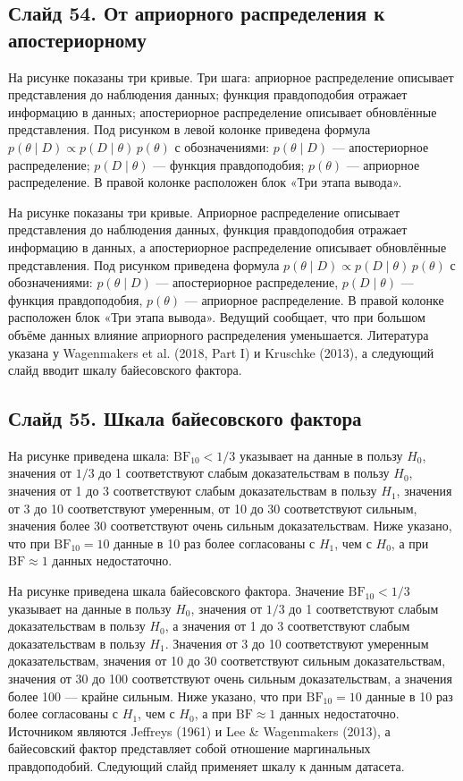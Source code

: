 \documentclass[11pt,a4paper]{article}
\begin{document}
\subsection*{Слайд 54. От априорного распределения к апостериорному}
\begin{onslide}
На рисунке показаны три кривые. Три шага: априорное распределение описывает представления до наблюдения данных; функция правдоподобия отражает информацию в данных; апостериорное распределение описывает обновлённые представления. Под рисунком в левой колонке приведена формула $p(\theta \mid D) \propto p(D \mid \theta)\,p(\theta)$ с обозначениями: $p(\theta \mid D)$ — апостериорное распределение; $p(D \mid \theta)$ — функция правдоподобия; $p(\theta)$ — априорное распределение. В правой колонке расположен блок «Три этапа вывода».
\end{onslide}
На рисунке показаны три кривые. Априорное распределение описывает представления до наблюдения данных, функция правдоподобия отражает информацию в данных, а апостериорное распределение описывает обновлённые представления. Под рисунком приведена формула $p(\theta \mid D) \propto p(D \mid \theta)\,p(\theta)$ с обозначениями: $p(\theta \mid D)$ — апостериорное распределение, $p(D \mid \theta)$ — функция правдоподобия, $p(\theta)$ — априорное распределение. В правой колонке расположен блок «Три этапа вывода». Ведущий сообщает, что при большом объёме данных влияние априорного распределения уменьшается. Литература указана у Wagenmakers et al. (2018, Part I) и Kruschke (2013), а следующий слайд вводит шкалу байесовского фактора.

\subsection*{Слайд 55. Шкала байесовского фактора}
\begin{onslide}
На рисунке приведена шкала: $\mathrm{BF}_{10} < 1/3$ указывает на данные в пользу $H_0$, значения от $1/3$ до 1 соответствуют слабым доказательствам в пользу $H_0$, значения от 1 до 3 соответствуют слабым доказательствам в пользу $H_1$, значения от 3 до 10 соответствуют умеренным, от 10 до 30 соответствуют сильным, значения более 30 соответствуют очень сильным доказательствам. Ниже указано, что при $\mathrm{BF}_{10} = 10$ данные в 10 раз более согласованы с $H_1$, чем с $H_0$, а при $\mathrm{BF} \approx 1$ данных недостаточно.
\end{onslide}
На рисунке приведена шкала байесовского фактора. Значение $\mathrm{BF}_{10} < 1/3$ указывает на данные в пользу $H_0$, значения от $1/3$ до 1 соответствуют слабым доказательствам в пользу $H_0$, а значения от 1 до 3 соответствуют слабым доказательствам в пользу $H_1$. Значения от 3 до 10 соответствуют умеренным доказательствам, значения от 10 до 30 соответствуют сильным доказательствам, значения от 30 до 100 соответствуют очень сильным доказательствам, а значения более 100 — крайне сильным. Ниже указано, что при $\mathrm{BF}_{10} = 10$ данные в 10 раз более согласованы с $H_1$, чем с $H_0$, а при $\mathrm{BF} \approx 1$ данных недостаточно. Источником являются Jeffreys (1961) и Lee \& Wagenmakers (2013), а байесовский фактор представляет собой отношение маргинальных правдоподобий. Следующий слайд применяет шкалу к данным датасета.
\end{document}
